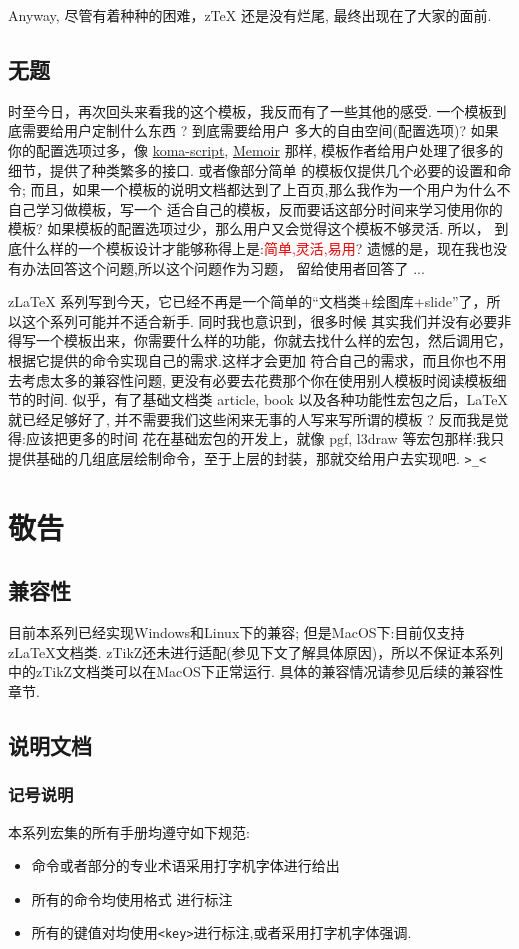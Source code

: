 \documentclass[
  hyper,    
  lang=cn,
  class=book,
  mathSpec={envStyle=leftbar, alias},
  toc={redef}
]{zlatex}
\let\cmd\ztexverb
\newcommand{\zkey}[1]{\texttt{<#1>}}
\begin{document}
Anyway, 尽管有着种种的困难，z\TeX{} 还是没有烂尾, 最终出现在了大家的面前. 

\section{无题}
时至今日，再次回头来看我的这个模板，我反而有了一些其他的感受. 一个模板到底需要给用户定制什么东西 ? 到底需要给用户
多大的自由空间(配置选项)? 如果你的配置选项过多，像 \href{https://www.ctan.org/pkg/koma-script}{koma-script}, 
\href{https://ctan.org/pkg/memoir}{Memoir} 那样, 模板作者给用户处理了很多的细节，提供了种类繁多的接口. 或者像部分简单
的模板仅提供几个必要的设置和命令; 而且，如果一个模板的说明文档都达到了上百页,那么我作为一个用户为什么不自己学习做模板，写一个
适合自己的模板，反而要话这部分时间来学习使用你的模板? 如果模板的配置选项过少，那么用户又会觉得这个模板不够灵活. 所以，
到底什么样的一个模板设计才能够称得上是:\textcolor{red}{简单,灵活,易用}? 遗憾的是，现在我也没有办法回答这个问题,所以这个问题作为习题，
留给使用者回答了 ...

z\LaTeX{} 系列写到今天，它已经不再是一个简单的``文档类+绘图库+slide''了，所以这个系列可能并不适合新手. 同时我也意识到，很多时候
其实我们并没有必要非得写一个模板出来，你需要什么样的功能，你就去找什么样的宏包，然后调用它，根据它提供的命令实现自己的需求.这样才会更加
符合自己的需求，而且你也不用去考虑太多的兼容性问题, 更没有必要去花费那个你在使用别人模板时阅读模板细节的时间. 似乎，有了基础文档类 
article, book 以及各种功能性宏包之后，\LaTeX{}就已经足够好了, 并不需要我们这些闲来无事的人写来写所谓的模板 ? 反而我是觉得:应该把更多的时间
花在基础宏包的开发上，就像 pgf, l3draw 等宏包那样:我只提供基础的几组底层绘制命令，至于上层的封装，那就交给用户去实现吧. \texttt{>\_<}


\chapter{敬告}
\section{兼容性}
目前本系列已经实现Windows和Linux下的兼容; 但是MacOS下:目前仅支持z\LaTeX{}文档类.
zTikZ还未进行适配(参见下文了解具体原因)，所以不保证本系列中的zTikZ文档类可以在MacOS下正常运行.
具体的兼容情况请参见后续的兼容性章节.

\section{说明文档}
\subsection{记号说明}
本系列宏集的所有手册均遵守如下规范:
\begin{itemize}
  \item 命令或者部分的专业术语采用打字机字体进行给出
  \item 所有的命令均使用格式 \cmd{\cmd}进行标注
  \item 所有的键值对均使用\zkey{key}进行标注,或者采用打字机字体强调.
\end{itemize}
\end{document}
